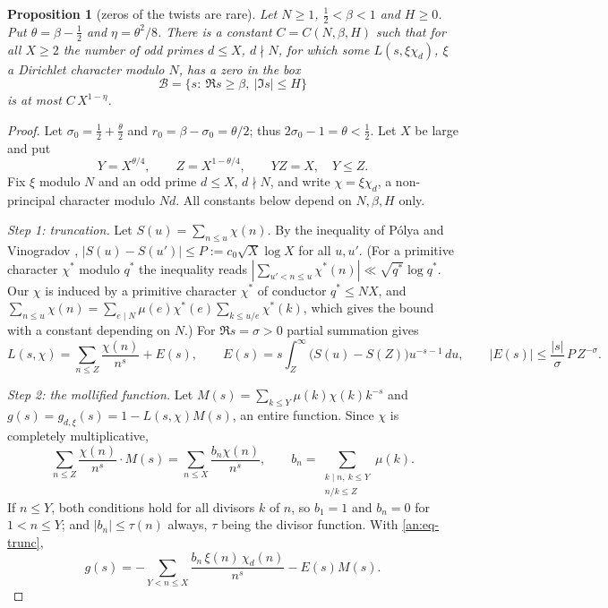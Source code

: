 \documentclass[10pt]{amsart}
\newtheorem{proposition}[theorem]{Proposition}
\theoremstyle{definition}
\theoremstyle{remark}
\begin{document}
\begin{proposition}[zeros of the twists are rare]\label{an:prop-density}
Let $N\ge1$, $\frac12<\beta<1$ and $H\ge0$. Put $\theta=\beta-\frac12$ and
$\eta=\theta^2/8$. There is a constant $C=C(N,\beta,H)$ such that for all
$X\ge2$ the number of odd primes $d\le X$, $d\nmid N$, for which some
$L(s,\xi\chi_d)$, $\xi$ a Dirichlet character modulo $N$, has a zero in the
box
\[
 \mathcal B=\{s:\ \Re s\ge\beta,\ |\Im s|\le H\}
\]
is at most $C\,X^{1-\eta}$.
\end{proposition}
\begin{proof}
Let $\sigma_0=\frac12+\frac\theta2$ and $r_0=\beta-\sigma_0=\theta/2$; thus
$2\sigma_0-1=\theta<\frac12$. Let $X$ be large and put
\[
 Y=X^{\theta/4},\qquad Z=X^{1-\theta/4},\qquad YZ=X,\quad Y\le Z .
\]
Fix $\xi$ modulo $N$ and an odd prime $d\le X$, $d\nmid N$, and write
$\chi=\xi\chi_d$, a non-principal character modulo $Nd$. All constants below
depend on $N,\beta,H$ only.

\emph{Step 1: truncation.} Let $S(u)=\sum_{n\le u}\chi(n)$. By the
inequality of P\'olya and Vinogradov \cite[Chapter~23]{Davenport},
$|S(u)-S(u')|\le P:=c_0\sqrt X\log X$ for all $u,u'$. (For a primitive
character $\chi^{*}$ modulo $q^{*}$ the inequality reads
$|\sum_{u'<n\le u}\chi^{*}(n)|\ll\sqrt{q^{*}}\log q^{*}$. Our $\chi$ is induced by
a primitive character $\chi^{*}$ of conductor $q^{*}\le NX$, and
$\sum_{n\le u}\chi(n)=\sum_{e\mid N}\mu(e)\chi^{*}(e)\sum_{k\le u/e}\chi^{*}(k)$,
which gives the bound with a constant depending on $N$.) For $\Re s=\sigma>0$
partial summation gives
\begin{equation}\label{an:eq-trunc}
 L(s,\chi)=\sum_{n\le Z}\frac{\chi(n)}{n^{s}}+E(s),\qquad
 E(s)=s\int_Z^\infty\bigl(S(u)-S(Z)\bigr)u^{-s-1}\,du,\qquad |E(s)|\le\frac{|s|}{\sigma}\,P\,Z^{-\sigma}.
\end{equation}

\emph{Step 2: the mollified function.} Let
$M(s)=\sum_{k\le Y}\mu(k)\chi(k)k^{-s}$ and $g(s)=g_{d,\xi}(s)=1-L(s,\chi)M(s)$,
an entire function. Since $\chi$ is completely multiplicative,
\[
 \sum_{n\le Z}\frac{\chi(n)}{n^{s}}\cdot M(s)=\sum_{n\le X}\frac{b_n\chi(n)}{n^{s}},\qquad
 b_n=\sum_{\substack{k\mid n,\ k\le Y\\ n/k\le Z}}\mu(k).
\]
If $n\le Y$, both conditions hold for all divisors $k$ of $n$, so $b_1=1$ and
$b_n=0$ for $1<n\le Y$; and $|b_n|\le\tau(n)$ always, $\tau$ being the
divisor function. With \eqref{an:eq-trunc},
\begin{equation}\label{an:eq-g}
 g(s)=-\sum_{Y<n\le X}\frac{b_n\,\xi(n)\,\chi_d(n)}{n^{s}}-E(s)M(s).
\end{equation}


\end{proof}
\end{document}
